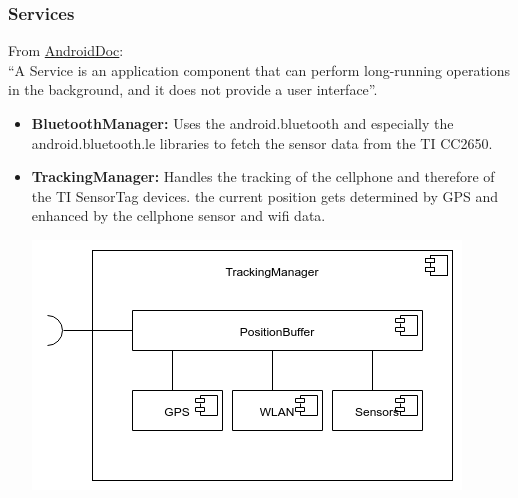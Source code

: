 \subsubsection{Services}
From \href{https://developer.android.com/guide/components/services.html}{AndroidDoc}: \\
``A Service is an application component that can perform long-running operations in the background, and it does not provide a user interface''.
\begin{itemize}
  \item \textbf{BluetoothManager:} Uses the android.bluetooth and especially the android.bluetooth.le libraries to fetch the sensor data from the TI CC2650.
  \item \textbf{TrackingManager:} Handles the tracking of the cellphone and therefore of the TI SensorTag devices. the current position gets determined by GPS and enhanced by the cellphone sensor and wifi data.
  \begin{center}
  \includegraphics[scale=0.4]{pics/TrackingManager_Composition.png}
  \end{center}
  

\end{itemize}
